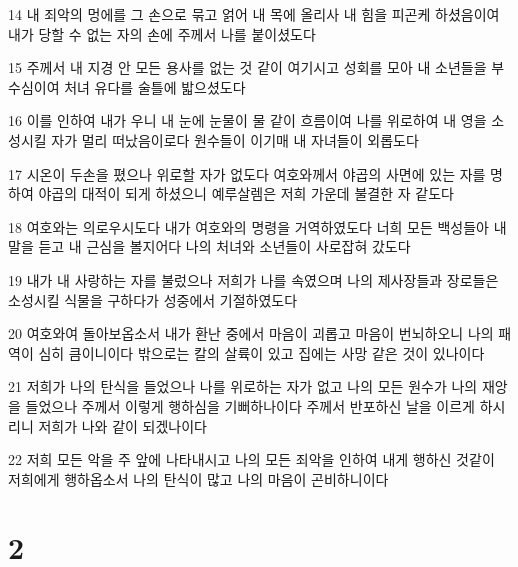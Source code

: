 \par 14 내 죄악의 멍에를 그 손으로 묶고 얽어 내 목에 올리사 내 힘을 피곤케 하셨음이여 내가 당할 수 없는 자의 손에 주께서 나를 붙이셨도다
\par 15 주께서 내 지경 안 모든 용사를 없는 것 같이 여기시고 성회를 모아 내 소년들을 부수심이여 처녀 유다를 술틀에 밟으셨도다
\par 16 이를 인하여 내가 우니 내 눈에 눈물이 물 같이 흐름이여 나를 위로하여 내 영을 소성시킬 자가 멀리 떠났음이로다 원수들이 이기매 내 자녀들이 외롭도다
\par 17 시온이 두손을 폈으나 위로할 자가 없도다 여호와께서 야곱의 사면에 있는 자를 명하여 야곱의 대적이 되게 하셨으니 예루살렘은 저희 가운데 불결한 자 같도다
\par 18 여호와는 의로우시도다 내가 여호와의 명령을 거역하였도다 너희 모든 백성들아 내 말을 듣고 내 근심을 볼지어다 나의 처녀와 소년들이 사로잡혀 갔도다
\par 19 내가 내 사랑하는 자를 불렀으나 저희가 나를 속였으며 나의 제사장들과 장로들은 소성시킬 식물을 구하다가 성중에서 기절하였도다
\par 20 여호와여 돌아보옵소서 내가 환난 중에서 마음이 괴롭고 마음이 번뇌하오니 나의 패역이 심히 큼이니이다 밖으로는 칼의 살륙이 있고 집에는 사망 같은 것이 있나이다
\par 21 저희가 나의 탄식을 들었으나 나를 위로하는 자가 없고 나의 모든 원수가 나의 재앙을 들었으나 주께서 이렇게 행하심을 기뻐하나이다 주께서 반포하신 날을 이르게 하시리니 저희가 나와 같이 되겠나이다
\par 22 저희 모든 악을 주 앞에 나타내시고 나의 모든 죄악을 인하여 내게 행하신 것같이 저희에게 행하옵소서 나의 탄식이 많고 나의 마음이 곤비하니이다

\chapter{2}

